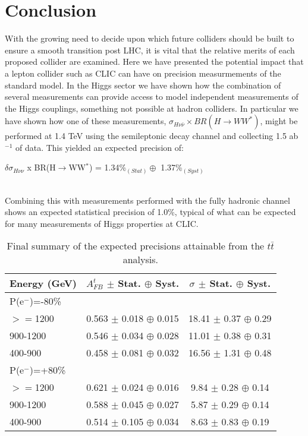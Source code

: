 \chapter{Conclusion}

With the growing need to decide upon which future colliders should be built to ensure a smooth transition post LHC, it is vital that the relative merits of each proposed collider are examined. Here we have presented the potential impact that a lepton collider such as \ac{CLIC} can have on precision measurmements of the standard model. In the Higgs sector we have shown how the combination of several measurements can provide access to model independent measurements of the Higgs couplings, something not possible at hadron colliders. In particular we have shown how one of these measurements, $\sigma_{H\nu\bar{\nu}} \times BR(H\rightarrow WW^*)$, might be performed at 1.4 TeV using the semileptonic decay channel and collecting 1.5 ab$^{-1}$ of data. This yielded an expected precision of: \\[10pt]\centerline{\large{$\delta\sigma_{H\nu\nu}$ x BR(H$\rightarrow$WW$^*$) = 1.34\%$_{(Stat)} \oplus$ 1.37\%$_{(Syst)}$}} \\[10pt] Combining this with measurements performed with the fully hadronic channel shows an expected statistical precision of 1.0\%, typical of what can be expected for many measurements of Higgs properties at \ac{CLIC}.

\begin{table}[t]
  \centering
  \begin{tabular}{l|c|c}
    \toprule
    Energy (GeV) & $A_{FB}^t$ $\pm$ Stat. $\oplus$ Syst. & $\sigma$  $\pm$ Stat. $\oplus$ Syst.   \\
    \midrule
    \midrule
    \multicolumn{3}{l}{ P(e$^-$)=-80\%}\\
    \midrule
    $>=$1200   & 0.563 $\pm$ 0.018 $\oplus$ 0.015 & 18.41 $\pm$ 0.37 $\oplus$ 0.29\\
    \midrule
    900-1200   & 0.546 $\pm$ 0.034 $\oplus$ 0.028 & 11.01 $\pm$ 0.38 $\oplus$ 0.31\\
    \midrule
    400-900    & 0.458 $\pm$ 0.081 $\oplus$ 0.032 & 16.56 $\pm$ 1.31 $\oplus$ 0.48\\
    \midrule
    \midrule
    \multicolumn{3}{l}{ P(e$^-$)=+80\%}\\
    \midrule
    $>=$1200  & 0.621 $\pm$ 0.024 $\oplus$ 0.016 & 9.84 $\pm$ 0.28 $\oplus$ 0.14\\
    \midrule
    900-1200  & 0.588 $\pm$ 0.045 $\oplus$ 0.027 & 5.87 $\pm$ 0.29 $\oplus$ 0.14\\
    \midrule
    400-900   & 0.514 $\pm$ 0.105 $\oplus$ 0.034 & 8.63 $\pm$ 0.83 $\oplus$ 0.19\\
    \bottomrule
  \end{tabular}
  \caption{Final summary of the expected precisions attainable from the $t\bar{t}$ analysis.}
  \label{conlusiontable}
\end{table}

